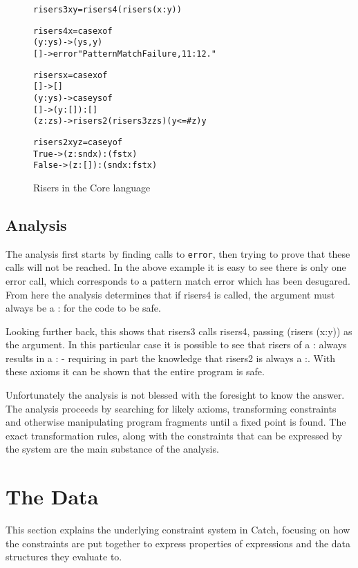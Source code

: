 \documentclass[preprint]{sigplanconf}
\newcommand{\T}[1]{\texttt{#1}}
\newenvironment{code}{\begin{alltt}\small}{\end{alltt}}
\begin{document}
\begin{figure}
\begin{code}
 risers3 x y = risers4 (risers (x : y))

 risers4 x = case x of
     (y:ys) -> (ys, y)
     [] -> error "Pattern Match Failure, 11:12."

 risers x = case x of
     [] -> []
     (y:ys) ->  case ys of
          [] -> (y : []) : []
          (z:zs) -> risers2 (risers3 z zs) (y <=# z) y

 risers2 x y z =  case y of
     True -> (z : snd x) : (fst x)
     False -> (z : []) : (snd x : fst x)
\end{code}
\caption{Risers in the Core language}
\label{fig:risers_core}
\end{figure}

\subsection{Analysis}

The analysis first starts by finding calls to \T{error}, then trying to prove that these calls will not be reached. In the above example it is easy to see there is only one error call, which corresponds to a pattern match error which has been desugared. From here the analysis determines that if risers4 is called, the argument must always be a : for the code to be safe.

Looking further back, this shows that risers3 calls risers4, passing (risers (x:y)) as the argument. In this particular case it is possible to see that risers of a : always results in a : - requiring in part the knowledge that risers2 is always a :. With these axioms it can be shown that the entire program is safe.

Unfortunately the analysis is not blessed with the foresight to know the answer. The analysis proceeds by searching for likely axioms, transforming constraints and otherwise manipulating program fragments until a fixed point is found. The exact transformation rules, along with the constraints that can be expressed by the system are the main substance of the analysis.


\section{The Data}

This section explains the underlying constraint system in Catch, focusing on how the constraints are put together to express properties of expressions and the data structures they evaluate to.
\end{document}
